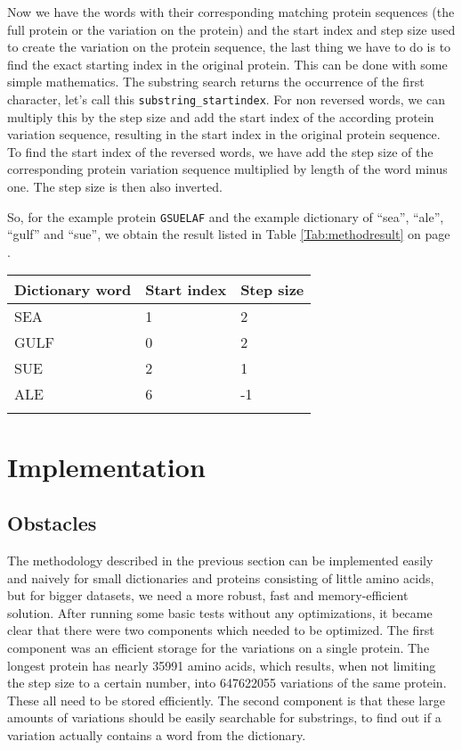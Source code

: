 \documentclass{bioinfo}
\begin{document}
Now we have the words with their corresponding matching protein sequences (the full protein or the variation on the protein) and the start index and step size used to create the variation on the protein sequence, the last thing we have to do is to find the exact starting index in the original protein. This can be done with some simple mathematics. The substring search returns the occurrence of the first character, let's call this \texttt{substring\_startindex}. For non reversed words, we can multiply this by the step size and add the start index of the according protein variation sequence, resulting in the start index in the original protein sequence. To find the start index of the reversed words, we have add the step size of the corresponding protein variation sequence multiplied by length of the word minus one. The step size is then also inverted.

So, for the example protein \texttt{GSUELAF} and the example dictionary of  ``sea'', ``ale'', ``gulf'' and ``sue'', we obtain the result listed in Table \ref{Tab:methodresult} on page \pageref{Tab:methodresult}.

\begin{table}[!t]
{\begin{tabular}{lll}\toprule
Dictionary word & Start index & Step size\\\midrule
SEA & 1 & 2 \\
GULF & 0 & 2 \\
SUE & 2 & 1 \\
ALE & 6 & -1 \\\botrule
\end{tabular}}{}
\end{table}

\section{Implementation}
\subsection{Obstacles}
The methodology described in the previous section can be implemented easily and naively for small dictionaries and proteins consisting of little amino acids, but for bigger datasets, we need a more robust, fast and memory-efficient solution. After running some basic tests without any optimizations, it became clear that there were two components which needed to be optimized. The first component was an efficient storage for the variations on a single protein. The longest protein has nearly 35991 amino acids, which results, when not limiting the step size to a certain number, into 647622055 variations of the same protein. These all need to be stored efficiently. The second component is that these large amounts of variations should be easily searchable for substrings, to find out if a variation actually contains a word from the dictionary.
\end{document}
